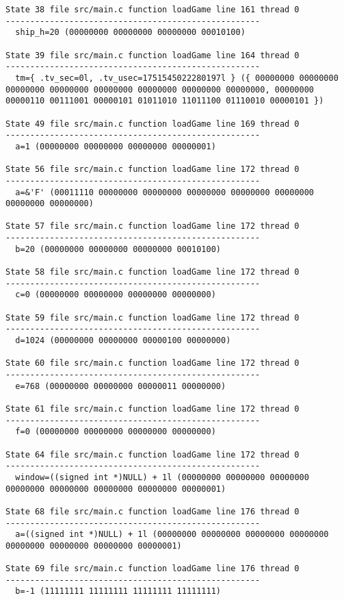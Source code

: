 \begin{verbatim}
State 38 file src/main.c function loadGame line 161 thread 0
----------------------------------------------------
  ship_h=20 (00000000 00000000 00000000 00010100)

State 39 file src/main.c function loadGame line 164 thread 0
----------------------------------------------------
  tm={ .tv_sec=0l, .tv_usec=1751545022280197l } ({ 00000000 00000000 00000000 00000000 00000000 00000000 00000000 00000000, 00000000 00000110 00111001 00000101 01011010 11011100 01110010 00000101 })

State 49 file src/main.c function loadGame line 169 thread 0
----------------------------------------------------
  a=1 (00000000 00000000 00000000 00000001)

State 56 file src/main.c function loadGame line 172 thread 0
----------------------------------------------------
  a=&'F' (00011110 00000000 00000000 00000000 00000000 00000000 00000000 00000000)

State 57 file src/main.c function loadGame line 172 thread 0
----------------------------------------------------
  b=20 (00000000 00000000 00000000 00010100)

State 58 file src/main.c function loadGame line 172 thread 0
----------------------------------------------------
  c=0 (00000000 00000000 00000000 00000000)

State 59 file src/main.c function loadGame line 172 thread 0
----------------------------------------------------
  d=1024 (00000000 00000000 00000100 00000000)

State 60 file src/main.c function loadGame line 172 thread 0
----------------------------------------------------
  e=768 (00000000 00000000 00000011 00000000)

State 61 file src/main.c function loadGame line 172 thread 0
----------------------------------------------------
  f=0 (00000000 00000000 00000000 00000000)

State 64 file src/main.c function loadGame line 172 thread 0
----------------------------------------------------
  window=((signed int *)NULL) + 1l (00000000 00000000 00000000 00000000 00000000 00000000 00000000 00000001)

State 68 file src/main.c function loadGame line 176 thread 0
----------------------------------------------------
  a=((signed int *)NULL) + 1l (00000000 00000000 00000000 00000000 00000000 00000000 00000000 00000001)

State 69 file src/main.c function loadGame line 176 thread 0
----------------------------------------------------
  b=-1 (11111111 11111111 11111111 11111111)


\end{verbatim}
